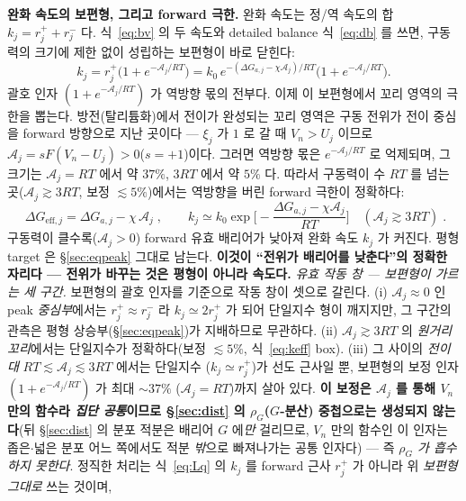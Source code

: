 \documentclass[11pt,a4paper]{article}
\newcommand{\eff}{\mathrm{eff}}
\begin{document}
\textbf{완화 속도의 보편형, 그리고 forward 극한.} 완화 속도는 정/역 속도의 합 $k_j=r_j^++r_j^-$ 다.
식~\eqref{eq:bv} 의 두 속도와 detailed balance 식~\eqref{eq:db} 를 쓰면, 구동력의 크기에 제한 없이 성립하는
보편형이 바로 닫힌다:
\begin{equation*}
k_j=r_j^+\big(1+e^{-\mathcal A_j/RT}\big)
=k_0\,e^{-(\Delta G_{a,j}-\chi\mathcal A_j)/RT}\big(1+e^{-\mathcal A_j/RT}\big).
\end{equation*}
괄호 인자 $(1+e^{-\mathcal A_j/RT})$ 가 역방향 몫의 전부다. 이제 이 보편형에서 꼬리 영역의 극한을 뽑는다.
방전(탈리튬화)에서 전이가 완성되는 꼬리 영역은 구동 전위가 전이 중심을 forward 방향으로 지난 곳이다 — $\xi_j$ 가
$1$ 로 갈 때 $V_n>U_j$ 이므로 $\mathcal A_j=sF(V_n-U_j)>0$($s=+1$)이다. 그러면 역방향 몫은 $e^{-\mathcal A_j/RT}$
로 억제되며, 그 크기는 $\mathcal A_j=RT$ 에서 약 $37\%$, $3RT$ 에서 약 $5\%$ 다. 따라서 구동력이 수 $RT$ 를 넘는
곳($\mathcal A_j\gtrsim3RT$, 보정 $\lesssim5\%$)에서는 역방향을 버린 forward 극한이 정확하다:
\begin{equation}
\boxed{\;\Delta G_{\eff,j}=\Delta G_{a,j}-\chi\,\mathcal A_j\;,\qquad
k_j\simeq k_0\exp\!\Big[-\frac{\Delta G_{a,j}-\chi\mathcal A_j}{RT}\Big]\quad(\mathcal A_j\gtrsim 3RT)\;.}
\label{eq:keff}
\end{equation}
구동력이 클수록($\mathcal A_j>0$) forward 유효 배리어가 낮아져 완화 속도 $k_j$ 가 커진다. 평형 target 은
\S\ref{sec:eqpeak} 그대로 남는다. \textbf{이것이 ``전위가 배리어를 낮춘다''의 정확한 자리다 — 전위가 바꾸는
것은 평형이 아니라 속도다.}
\emph{유효 작동 창 — 보편형이 가르는 세 구간.} 보편형의 괄호 인자를 기준으로 작동 창이 셋으로 갈린다.
(i) $\mathcal A_j\approx0$ 인 peak \emph{중심부}에서는 $r_j^+\approx r_j^-$ 라 $k_j\simeq2r_j^+$ 가 되어
단일지수 형이 깨지지만, 그 구간의 관측은 평형 상승부(\S\ref{sec:eqpeak})가 지배하므로 무관하다.
(ii) $\mathcal A_j\gtrsim3RT$ 의 \emph{원거리 꼬리}에서는 단일지수가 정확하다(보정 $\lesssim5\%$,
식~\eqref{eq:keff} box). (iii) 그 사이의 \emph{전이대} $RT\lesssim\mathcal A_j\lesssim3RT$ 에서는 단일지수
($k_j\simeq r_j^+$)가 선도 근사일 뿐, 보편형의 보정 인자 $(1+e^{-\mathcal A_j/RT})$ 가 최대 $\sim37\%$
($\mathcal A_j=RT$)까지 살아 있다. \textbf{이 보정은 $\mathcal A_j$ 를 통해 $V_n$ 만의 함수라
\emph{집단 공통}이므로 \S\ref{sec:dist} 의 $\rho_G$($G$-분산) 중첩으로는 생성되지 않는다}(뒤 \S\ref{sec:dist} 의
분포 적분은 배리어 $G$ 에\emph{만} 걸리므로, $V_n$ 만의 함수인 이 인자는 좁은$\cdot$넓은 분포 어느 쪽에서도 적분
\emph{밖}으로 빠져나가는 공통 인자다) — 즉 \emph{$\rho_G$ 가 흡수하지 못한다}. 정직한 처리는 식~\eqref{eq:Lq} 의 $k_j$ 를 forward 근사 $r_j^+$ 가 아니라 위 \emph{보편형 그대로} 쓰는 것이며,
\end{document}
